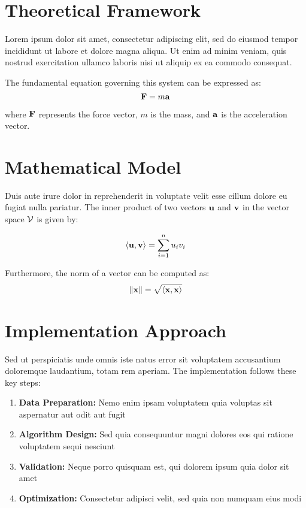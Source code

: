 \documentclass[../main.tex]{subfiles}
\begin{document}
\section{Theoretical Framework}

Lorem ipsum dolor sit amet, consectetur adipiscing elit, sed do eiusmod tempor incididunt ut labore et dolore magna aliqua. Ut enim ad minim veniam, quis nostrud exercitation ullamco laboris nisi ut aliquip ex ea commodo consequat.

The fundamental equation governing this system can be expressed as:
\begin{equation}
    \mathbf{F} = m \mathbf{a}
    \label{eq:newton}
\end{equation}

where $\mathbf{F}$ represents the force vector, $m$ is the mass, and $\mathbf{a}$ is the acceleration vector.

\section{Mathematical Model}

Duis aute irure dolor in reprehenderit in voluptate velit esse cillum dolore eu fugiat nulla pariatur. The inner product of two vectors $\mathbf{u}$ and $\mathbf{v}$ in the vector space $\mathcal{V}$ is given by:

\begin{equation}
    \langle \mathbf{u},\mathbf{v} \rangle = \sum_{i=1}^{n} u_i v_i
    \label{eq:inner_product}
\end{equation}

Furthermore, the norm of a vector can be computed as:
\begin{equation}
    \| \mathbf{x} \| = \sqrt{\langle \mathbf{x},\mathbf{x} \rangle}
    \label{eq:norm}
\end{equation}

\section{Implementation Approach}

Sed ut perspiciatis unde omnis iste natus error sit voluptatem accusantium doloremque laudantium, totam rem aperiam. The implementation follows these key steps:

\begin{enumerate}
    \item \textbf{Data Preparation:} Nemo enim ipsam voluptatem quia voluptas sit aspernatur aut odit aut fugit
    \item \textbf{Algorithm Design:} Sed quia consequuntur magni dolores eos qui ratione voluptatem sequi nesciunt
    \item \textbf{Validation:} Neque porro quisquam est, qui dolorem ipsum quia dolor sit amet
    \item \textbf{Optimization:} Consectetur adipisci velit, sed quia non numquam eius modi
\end{enumerate}
\end{document}
